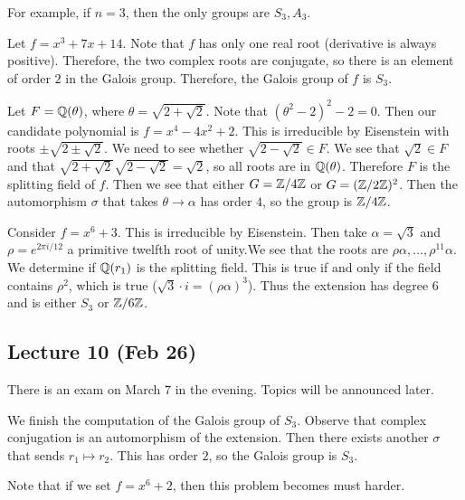 \documentclass[10pt, twoside]{article}
\begin{document}
        For example, if $n = 3$, then the only groups are $S_3,A_3$.
        \begin{exm}
            Let $f = x^3 + 7x+14$. Note that $f$ has only one real root (derivative is always positive). Therefore, the two complex roots are conjugate, so there is an element of order $2$ in the Galois group. Therefore, the Galois group of $f$ is $S_3$.
        \end{exm}

        \begin{exm}
            Let $F = \mathbb{Q}(\theta)$, where $\theta = \sqrt{2+\sqrt{2}}$. Note that $(\theta^2-2)^2 - 2 = 0$. Then our candidate polynomial is $f = x^4 - 4x^2+2$. This is irreducible by Eisenstein with roots $\pm \sqrt{2 \pm \sqrt{2}}$. We need to see whether $\sqrt{2-\sqrt{2}} \in F$. We see that $\sqrt{2} \in F$ and that $\sqrt{2+\sqrt{2}}\sqrt{2-\sqrt{2}} = \sqrt{2}$, so all roots are in $\mathbb{Q}(\theta)$. Therefore $F$ is the splitting field of $f$. Then we see that either $G = \mathbb{Z}/4\mathbb{Z}$ or $G = (\mathbb{Z}/2\mathbb{Z})^2$. Then the automorphism $\sigma$ that takes $\theta \to \alpha$ has order $4$, so the group is $\mathbb{Z}/4\mathbb{Z}$.
        \end{exm}

        \begin{exm}
            Consider $f = x^6+3$. This is irreducible by Eisenstein. Then take $\alpha = \sqrt{3}$ and $\rho = e^{2 \pi i /12}$ a primitive twelfth root of unity.We see that the roots are $\rho\alpha, \ldots, \rho^{11}\alpha$. We determine if $\mathbb{Q}(r_1)$ is the splitting field. This is true if and only if the field contains $\rho^2$, which is true ($\sqrt{3} \cdot i = (\rho\alpha)^3$). Thus the extension has degree $6$ and is either $S_3$ or $\mathbb{Z}/6\mathbb{Z}$.
        \end{exm}

        \subsection{Lecture 10 (Feb 26)}
        There is an exam on March $7$ in the evening. Topics will be announced later.

        We finish the computation of the Galois group of $S_3$. Observe that complex conjugation is an automorphism of the extension. Then there exists another $\sigma$ that sends $r_1 \mapsto r_2$. This has order $2$, so the Galois group is $S_3$.

        Note that if we set $f = x^6+2$, then this problem becomes must harder.
\end{document}
